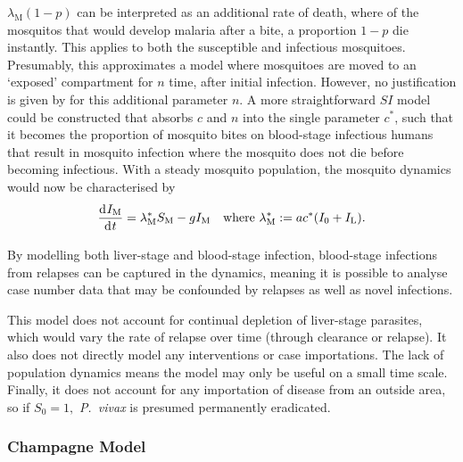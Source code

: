 $\lambda_\mathrm{M}(1 - p)$ can be interpreted as an additional rate of death,
where of the mosquitos that would develop malaria after a bite, a proportion
$1 - p$ die instantly. This applies to both the susceptible and infectious
mosquitoes. Presumably, this approximates a model where mosquitoes are moved
to an `exposed' compartment for $n$ time, after initial infection.
However, no justification is given by  for
this additional parameter $n$. A more straightforward $SI$ model could be
constructed that absorbs $c$ and $n$ into the single parameter $c^*$, such
that it becomes the proportion of mosquito bites on blood-stage infectious
humans that result in mosquito infection where the mosquito does not die
before becoming infectious. With a steady mosquito population, the mosquito
dynamics would now be characterised by
$$
    \frac{\diff I_\mathrm{M}}{\diff t}
    = \lambda_\mathrm{M}^*S_\mathrm{M} - gI_\mathrm{M}
    \quad\text{where } \lambda_\mathrm{M}^*:= ac^*(I_0 + I_\mathrm{L}).
$$

By modelling both liver-stage and blood-stage infection, blood-stage infections
from relapses can be captured in the dynamics, meaning it is possible to
analyse case number data that may be confounded by relapses as well as
novel infections.

This model does not account for continual depletion of liver-stage parasites,
which would vary the rate of relapse over time (through clearance or relapse).
It also does not directly model any interventions or case importations. The
lack of population dynamics means the model may only be useful on a small time
scale. Finally, it does not account for any importation of disease from an
outside area, so if $S_0 = 1,$ \textit{P.\ vivax} is presumed permanently
eradicated.

\subsubsection*{Champagne Model}\label{sec:champ_mod}

